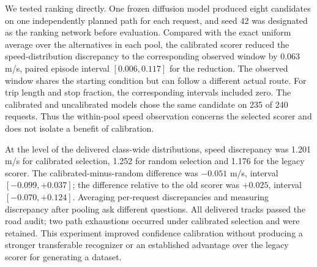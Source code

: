 We tested ranking directly. One frozen diffusion model produced eight candidates on one independently planned path for each request, and seed 42 was designated as the ranking network before evaluation. Compared with the exact uniform average over the alternatives in each pool, the calibrated scorer reduced the speed-distribution discrepancy to the corresponding observed window by 0.063 m/s, paired episode interval $[0.006,0.117]$ for the reduction. The observed window shares the starting condition but can follow a different actual route. For trip length and stop fraction, the corresponding intervals included zero. The calibrated and uncalibrated models chose the same candidate on 235 of 240 requests. Thus the within-pool speed observation concerns the selected scorer and does not isolate a benefit of calibration.

At the level of the delivered class-wide distributions, speed discrepancy was 1.201 m/s for calibrated selection, 1.252 for random selection and 1.176 for the legacy scorer. The calibrated-minus-random difference was $-0.051$ m/s, interval $[-0.099,+0.037]$; the difference relative to the old scorer was $+0.025$, interval $[-0.070,+0.124]$. Averaging per-request discrepancies and measuring discrepancy after pooling ask different questions. All delivered tracks passed the road audit; two path exhaustions occurred under calibrated selection and were retained. This experiment improved confidence calibration without producing a stronger transferable recognizer or an established advantage over the legacy scorer for generating a dataset.
